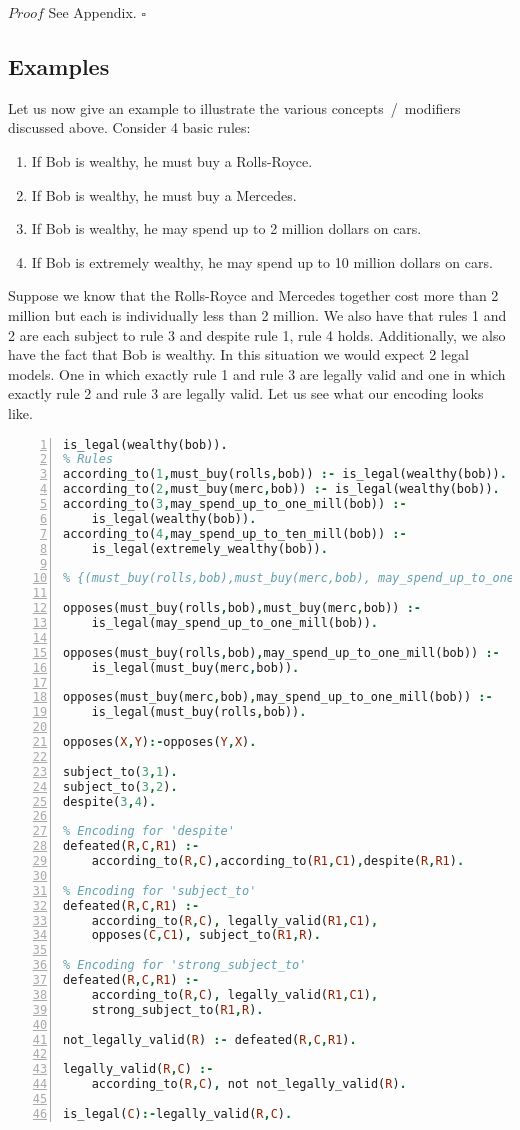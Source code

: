 $Proof$ See Appendix. $\square$


\subsection{Examples}
Let us now give an example to illustrate the various concepts~/~modifiers discussed above.
Consider 4 basic rules:
\begin{enumerate}
  \item If Bob is wealthy, he must buy a Rolls-Royce.
  \item If Bob is wealthy, he must buy a Mercedes.
  \item If Bob is wealthy, he may spend up to 2 million dollars on cars.
  \item If Bob is extremely wealthy, he may spend up to 10 million dollars on cars.
\end{enumerate}
Suppose we know that the Rolls-Royce and Mercedes together cost more
than 2 million but each is individually less than 2 million. We also
have that rules 1 and 2 are each subject to rule 3 and despite rule 1,
rule 4 holds. Additionally, we also have the fact that Bob is
wealthy. In this situation we would expect 2 legal models. One in which
exactly rule 1 and rule 3 are legally valid and one in which exactly
rule 2 and rule 3 are legally valid. Let us see what our encoding
looks like.
\begin{lstlisting}[language=Prolog, numbers=left]
is_legal(wealthy(bob)).
% Rules
according_to(1,must_buy(rolls,bob)) :- is_legal(wealthy(bob)).
according_to(2,must_buy(merc,bob)) :- is_legal(wealthy(bob)).
according_to(3,may_spend_up_to_one_mill(bob)) :-
    is_legal(wealthy(bob)).
according_to(4,may_spend_up_to_ten_mill(bob)) :-
    is_legal(extremely_wealthy(bob)).

% {(must_buy(rolls,bob),must_buy(merc,bob), may_spend_up_to_one_mill(bob)} is a min. inconsistent set.

opposes(must_buy(rolls,bob),must_buy(merc,bob)) :-
    is_legal(may_spend_up_to_one_mill(bob)).

opposes(must_buy(rolls,bob),may_spend_up_to_one_mill(bob)) :-
    is_legal(must_buy(merc,bob)).

opposes(must_buy(merc,bob),may_spend_up_to_one_mill(bob)) :-
    is_legal(must_buy(rolls,bob)).

opposes(X,Y):-opposes(Y,X).

subject_to(3,1).
subject_to(3,2).
despite(3,4).

% Encoding for 'despite'
defeated(R,C,R1) :-
    according_to(R,C),according_to(R1,C1),despite(R,R1).

% Encoding for 'subject_to'
defeated(R,C,R1) :-
    according_to(R,C), legally_valid(R1,C1),
    opposes(C,C1), subject_to(R1,R).

% Encoding for 'strong_subject_to'
defeated(R,C,R1) :-
    according_to(R,C), legally_valid(R1,C1),
    strong_subject_to(R1,R).

not_legally_valid(R) :- defeated(R,C,R1).

legally_valid(R,C) :- 
    according_to(R,C), not not_legally_valid(R).

is_legal(C):-legally_valid(R,C).
\end{lstlisting}

